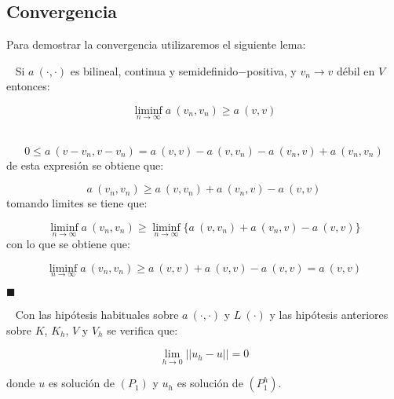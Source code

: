 \subsection{Convergencia}

Para demostrar la convergencia utilizaremos el siguiente lema:

\begin{lema}\label{lema:debilsci}
\ \newline
Si $a\ (\cdot ,\cdot )$ es bilineal, continua y semidefinido$-$positiva,
y $v_n \to v$ d\'ebil en $V$ entonces:

\begin{displaymath}
\liminf_{n \to \infty} a\ (v_n,v_n) \ge a\ (v,v)
\end{displaymath}
\end{lema}

\begin{demoslema}
\ \\
\begin{displaymath}
0 \le a\ (v-v_n,v-v_n)=a\ (v,v)-a\ (v,v_n)-a\ (v_n,v)+a\ (v_n,v_n)
\end{displaymath}
de esta expresi\'on se obtiene que:

\begin{displaymath}
a\ (v_n,v_n) \ge a\ (v,v_n)+a\ (v_n,v)-a\ (v,v)
\end{displaymath}
tomando limites se tiene que:

\begin{displaymath}
\liminf_{n \to \infty} a\ (v_n,v_n) \ge \liminf_{n\to \infty} \{ a\ (v,v_n)+
a\ (v_n,v) -a\ (v,v)\}
\end{displaymath}
con lo que se obtiene que:

\begin{displaymath}
\liminf_{n \to \infty} a\ (v_n,v_n) \ge a\ (v,v) + a\ (v,v)-a\ (v,v) = a\ (v,v)
\end{displaymath}

\begin{flushright}
$\blacksquare$
\end{flushright}
\end{demoslema}

\begin{teorema}[Convergencia de $(P^h_1)$]
\ \newline
Con las hip\'otesis habituales sobre $a\ (\cdot ,\cdot )$ y $L\ (\cdot )$ y
las hip\'otesis anteriores sobre $K$, $K_h$, $V$ y $V_h$ se verifica que:

\begin{displaymath}
\lim_{h \to 0} ||u_h-u|| = 0
\end{displaymath}

donde $u$ es soluci\'on de $(P_1)$ y $u_h$ es soluci\'on de $(P^h_1)$.
\end{teorema}

